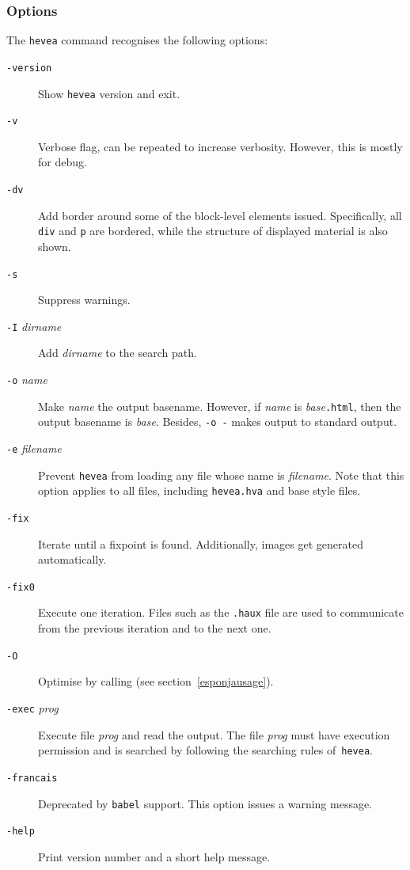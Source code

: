 \subsubsection{\label{heveaoptions}Options}
The \texttt{hevea} command recognises the following options:
\begin{description}
\item[{\tt -version}] Show \texttt{hevea} version and exit.
\item[{\tt -v}] Verbose flag, can be repeated to increase
verbosity. However, this is mostly for debug.
\item[{\tt -dv}] Add border around some of the block-level
elements issued. Specifically, all \verb+div+ and \verb+p+ are bordered,
while the structure of displayed material is also shown.
\item[{\tt -s}] Suppress warnings.
\item[{\tt -I} {\it dirname}] Add {\it dirname} to the search path.
\item[{\tt -o} {\it name}] Make \textit{name} the output basename.
However, if \textit{name} is \textit{base}\texttt{.html}, then
the output basename is \textit{base}.
Besides, {\tt -o -} makes \hevea{} output to standard output.
\item[{\tt -e} {\it filename}] Prevent \texttt{hevea} from loading any file
whose name is \textit{filename}. Note that this option applies to all
files, including \texttt{hevea.hva} and base style files.
\item[{\tt -fix}] Iterate \hevea{} until a fixpoint is found.
Additionally, images get generated automatically.
\item[{\tt -fix0}] Execute one iteration.
Files such as the \texttt{.haux} file are used to communicate from the previous
iteration and  to the next one.
\item[{\tt -O}] Optimise \html{} by calling \esponja{} (see
section~\ref{esponjausage}).
\item[{\tt -exec} {\it prog}] Execute file \textit{prog} and read the
output. The file \textit{prog} must have execution permission and is
searched by following the searching rules of~\texttt{hevea}.
\item[{\tt -francais}] Deprecated by \texttt{babel} support. This
option issues a warning message.
\item[{\tt -help}] Print version number and a short help message.
\end{description}

